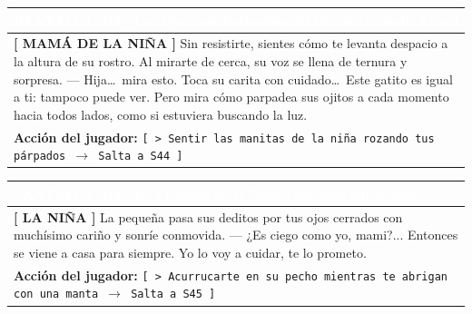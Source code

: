 \documentclass[11pt, a4paper]{article}
\begin{document}
\noindent
\begin{tabularx}{\textwidth}{|X|}
\hline
\rowcolor{colorExito}
\textbf{\textcolor{white}{PANTALLA S43 $\cdot$ Los Ojos que Parpadean}} \hfill \small\textcolor{white}{El Descubrimiento Visual} \\ \hline
\rowcolor{colorTextoBox}
\textbf{\textcolor{colorEmisor}{[ MAMÁ DE LA NIÑA ]}} \vspace{0.2em}\newline
Sin resistirte, sientes cómo te levanta despacio a la altura de su rostro. Al mirarte de cerca, su voz se llena de ternura y sorpresa. \newline
--- Hija\ldots\ mira esto. Toca su carita con cuidado\ldots\ Este gatito es igual a ti: tampoco puede ver. Pero mira cómo parpadea sus ojitos a cada momento hacia todos lados, como si estuviera buscando la luz. \\ \hline
\rowcolor{colorBotonBox}
\textbf{Acción del jugador:} \newline
\texttt{[ > Sentir las manitas de la niña rozando tus párpados $\rightarrow$ Salta a S44 ]} \\ \hline
\end{tabularx}

\vspace{1em}

\noindent
\begin{tabularx}{\textwidth}{|X|}
\hline
\rowcolor{colorExito}
\textbf{\textcolor{white}{PANTALLA S44 $\cdot$ La Promesa de la Niña}} \hfill \small\textcolor{white}{Conexión Emocional} \\ \hline
\rowcolor{colorTextoBox}
\textbf{\textcolor{colorEmisor}{[ LA NIÑA ]}} \vspace{0.2em}\newline
La pequeña pasa sus deditos por tus ojos cerrados con muchísimo cariño y sonríe conmovida. \newline
--- ¿Es ciego como yo, mami?... Entonces se viene a casa para siempre. Yo lo voy a cuidar, te lo prometo. \\ \hline
\rowcolor{colorBotonBox}
\textbf{Acción del jugador:} \newline
\texttt{[ > Acurrucarte en su pecho mientras te abrigan con una manta $\rightarrow$ Salta a S45 ]} \\ \hline
\end{tabularx}

\vspace{1em}
\end{document}
